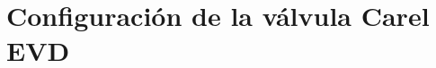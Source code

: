 \documentclass[twoside, openany, a4paper, 12pt, fleqn]{report}
\begin{document}

    \section{Configuración de la válvula Carel EVD}
    \label{sec:configuracion_valvula}
    

    






\end{document}
